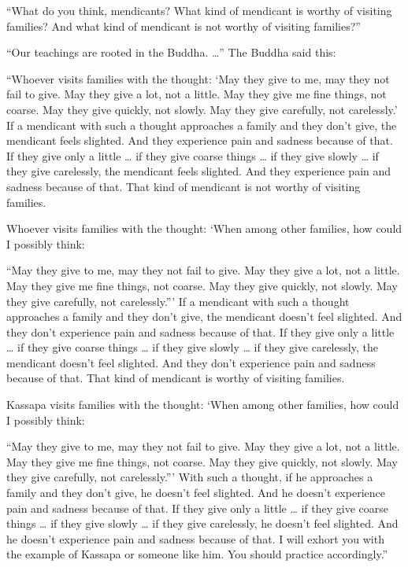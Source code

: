 \documentclass[12pt,openany]{book}%
\begin{document}
“What do you think, mendicants? What kind of mendicant is worthy of visiting families? And what kind of mendicant is not worthy of visiting families?” 

“Our teachings are rooted in the Buddha. …” The Buddha said this: 

“Whoever visits families with the thought: ‘May they give to me, may they not fail to give. May they give a lot, not a little. May they give me fine things, not coarse. May they give quickly, not slowly. May they give carefully, not carelessly.’ If a mendicant with such a thought approaches a family and they don’t give, the mendicant feels slighted. And they experience pain and sadness because of that. If they give only a little … if they give coarse things … if they give slowly … if they give carelessly, the mendicant feels slighted. And they experience pain and sadness because of that. That kind of mendicant is not worthy of visiting families. 

Whoever visits families with the thought: ‘When among other families, how could I possibly think: 

“May they give to me, may they not fail to give. May they give a lot, not a little. May they give me fine things, not coarse. May they give quickly, not slowly. May they give carefully, not carelessly.”’ If a mendicant with such a thought approaches a family and they don’t give, the mendicant doesn’t feel slighted. And they don’t experience pain and sadness because of that. If they give only a little … if they give coarse things … if they give slowly … if they give carelessly, the mendicant doesn’t feel slighted. And they don’t experience pain and sadness because of that. That kind of mendicant is worthy of visiting families. 

Kassapa visits families with the thought: ‘When among other families, how could I possibly think: 

“May they give to me, may they not fail to give. May they give a lot, not a little. May they give me fine things, not coarse. May they give quickly, not slowly. May they give carefully, not carelessly.”’ With such a thought, if he approaches a family and they don’t give, he doesn’t feel slighted. And he doesn’t experience pain and sadness because of that. If they give only a little … if they give coarse things … if they give slowly … if they give carelessly, he doesn’t feel slighted. And he doesn’t experience pain and sadness because of that. I will exhort you with the example of Kassapa or someone like him. You should practice accordingly.” 
\end{document}
